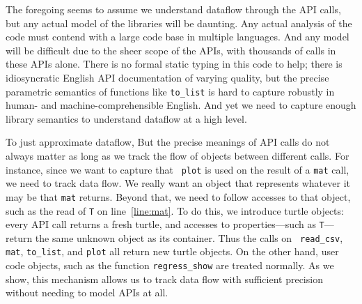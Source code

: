 The foregoing seems to assume we understand dataflow through the API
calls, but any actual model of the libraries will be daunting.  Any
actual analysis of the code must contend with a large code base in
multiple languages.  And any model will be difficult due to the sheer
scope of the APIs, with thousands of calls in these APIs alone.  There
is no formal static typing in this code to help; there is
idiosyncratic English API documentation of varying quality, but the
precise parametric semantics of functions like {\tt to\_list} is hard
to capture robustly in human- and machine-comprehensible English.  And
yet we need to capture enough library semantics to understand dataflow
at a high level.

To just approximate dataflow, But the precise meanings of API calls do
not always matter as long as we track the flow of objects between
different calls.  For instance, since we want to capture that {\tt
plot} is used on the result of a {\tt mat} call, we need to track
data flow.  We really want an object that represents whatever it may
be that {\tt mat} returns.  Beyond that, we need to follow accesses to
that object, such as the read of {\tt T} on line~\ref{line:mat}.  To
do this, we introduce turtle objects: every API call returns a fresh
turtle, and accesses to properties---such as {\tt T}--- return the
same unknown object as its container.  Thus the calls on {\tt
  read\_csv}, {\tt mat}, {\tt to\_list}, and {\tt plot} all return new
turtle objects.  On the other hand, user code objects, such as the
function {\tt regress\_show} are treated normally.  As we show, this
mechanism allows us to track data flow with sufficient precision
without needing to model APIs at all.
